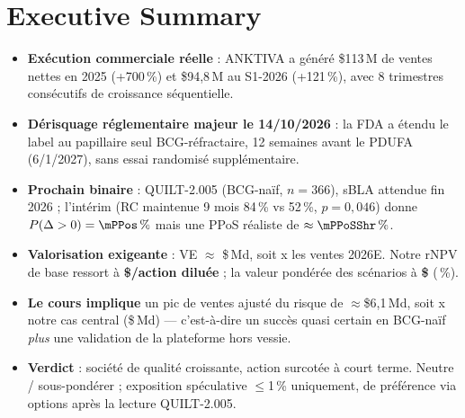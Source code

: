 \documentclass[10pt,a4paper]{article}
\begin{document}
\tableofcontents
\newpage

\section{Executive Summary}

\begin{keybox}
\begin{itemize}[leftmargin=12pt]
\item \textbf{Ex\'ecution commerciale r\'eelle} : ANKTIVA a g\'en\'er\'e \$113\,M de ventes nettes en 2025 (+700\,\%) et \$94,8\,M au S1-2026 (+121\,\%), avec 8 trimestres cons\'ecutifs de croissance s\'equentielle.
\item \textbf{D\'erisquage r\'eglementaire majeur le 14/10/2026} : la FDA a \'etendu le label au papillaire seul BCG-r\'efractaire, 12 semaines avant le PDUFA (6/1/2027), sans essai randomis\'e suppl\'ementaire.
\item \textbf{Prochain binaire} : QUILT-2.005 (BCG-na\"if, $n=366$), sBLA attendue fin 2026 ; l'int\'erim (RC maintenue 9 mois 84\,\% vs 52\,\%, $p=0{,}046$) donne $P(\Delta>0)=\mPPos\,\%$ mais une PPoS r\'ealiste de $\approx\mPPoSShr\,\%$.
\item \textbf{Valorisation exigeante} : VE $\approx$ \$\mEntVal\,Md, soit \mEVsales x les ventes 2026E. Notre rNPV de base ressort \`a \textbf{\$\mVPSBase/action dilu\'ee} ; la valeur pond\'er\'ee des sc\'enarios \`a \textbf{\$\mEVW} (\mUpside\,\%).
\item \textbf{Le cours implique} un pic de ventes ajust\'e du risque de $\approx$\$6,1\,Md, soit \mImplMult x notre cas central (\$\mRiskPeak\,Md) --- c'est-\`a-dire un succ\`es quasi certain en BCG-na\"if \emph{plus} une validation de la plateforme hors vessie.
\item \textbf{Verdict} : soci\'et\'e de qualit\'e croissante, action surcot\'ee \`a court terme. Neutre / sous-pond\'erer ; exposition sp\'eculative $\leq$1\,\% uniquement, de pr\'ef\'erence via options apr\`es la lecture QUILT-2.005.
\end{itemize}
\end{keybox}
\end{document}
